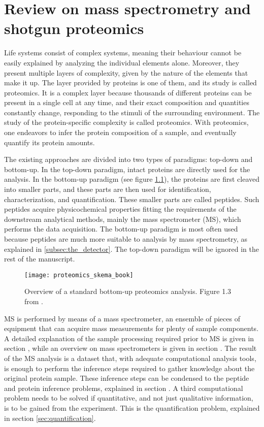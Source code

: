 \documentclass[thesis]{subfiles}
\begin{document}
\chapter{Review on mass spectrometry and shotgun proteomics}
\label{chap:mass_spec}

Life systems consist of complex systems, meaning their behaviour cannot be easily explained by analyzing the individual elements alone. Moreover, they present multiple layers of complexity, given by the nature of the elements that make it up. The layer provided by proteins is one of them, and its study is called proteomics. It is a complex layer because thousands of different proteins can be present in a single cell at any time, and their exact composition and quantities constantly change, responding to the stimuli of the surrounding environment. The study of the protein-specific complexity is called proteomics. With proteomics, one endeavors to infer the protein composition of a sample, and eventually quantify its protein amounts.

The existing approaches are divided into two types of paradigms: top-down and bottom-up. In the top-down paradigm, intact proteins are directly used for the analysis. In the bottom-up paradigm (see figure \ref{fig:proteomics_overview}), the proteins are first cleaved into smaller parts, and these parts are then used for identification, characterization, and quantification. These smaller parts are called peptides. \cite{Barsnes2008}  Such peptides acquire physicochemical properties fitting the requirements of the downstream analytical methods, mainly the mass spectrometer (MS), which performs the data acquisition. The bottom-up paradigm is most often used because peptides are much more suitable to analysis by mass spectrometry, as explained in \ref{subsec:the_detector}. The top-down paradigm will be ignored in the rest of the manuscript.

\begin{figure}[!h]
\texttt{[image: proteomics\_skema\_book]}
\caption{Overview of a standard bottom-up proteomics analysis. Figure 1.3 from \cite{Barsnes2008}.}
\label{fig:proteomics_overview}
\end{figure}

MS is performed by means of a mass spectrometer, an ensemble of pieces of equipment that can acquire mass measurements for plenty of sample components. A detailed explanation of the sample processing required prior to MS is given in section \label{sec:sample processing}, while an overview on mass spectrometers is given in section \label{sec:the mass spectrometer}. The result of the MS analysis is a dataset that, with adequate computational analysis tools, is enough to perform the inference steps required to gather knowledge about the original protein sample. These inference steps can be condensed to the peptide and protein inference problems, explained in section \label{sec:peptide and protein inference}. A third computational problem needs to be solved if quantitative, and not just qualitative information, is to be gained from the experiment. This is the quantification problem, explained in section \ref{sec:quantification}.
\end{document}
